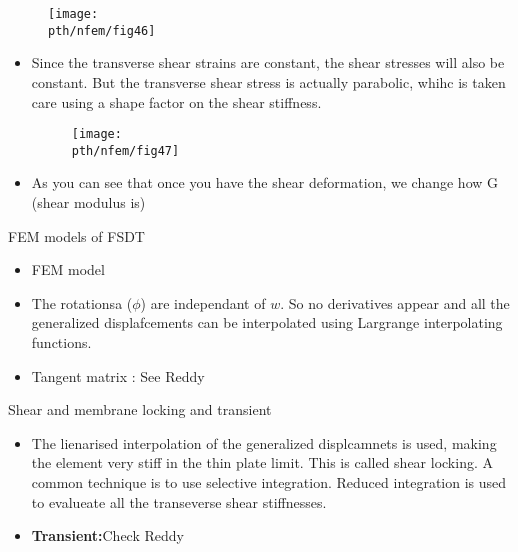 	\begin{frame}
		\begin{figure}
			\centering
			\texttt{[image: \\pth/nfem/fig46]}  		
		\end{figure}
	\end{frame}


	\begin{frame}
		\begin{itemize}
			\item Since the transverse shear strains are constant, the shear stresses will also be constant. But the transverse shear stress is actually parabolic, whihc is taken care using a shape factor on the shear stiffness. 
			\begin{figure}
				\centering
				\texttt{[image: \\pth/nfem/fig47]}  		
			\end{figure}
			\item As you can see that once you have the shear deformation, we change how G (shear modulus is)
		\end{itemize}
	\end{frame}


	\begin{frame}{FEM models of FSDT}
		\begin{itemize}
			\item FEM model
			\item  The rotationsa ($\phi$) are independant of $w$. So no derivatives appear and all the  generalized displafcements can be interpolated using Largrange interpolating functions.
			\item Tangent matrix : See Reddy
			
		\end{itemize}
	\end{frame}


	\begin{frame}{Shear and membrane locking and transient}
		\begin{itemize}
			\item The lienarised interpolation of the generalized displcamnets is used, making the element very stiff in the thin plate limit. This is called shear locking. A common technique is to use selective integration. Reduced integration is used to evalueate all the transeverse shear stiffnesses.			
			\item \textbf{Transient:}Check Reddy
	\end{itemize}
	\end{frame}


